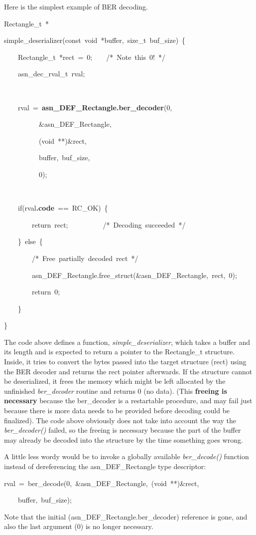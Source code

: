 \documentclass[english,oneside,12pt]{book}
\newenvironment{lyxcode}
{\par\begin{list}{}{
\setlength{\rightmargin}{\leftmargin}
\setlength{\listparindent}{0pt}%
\raggedright
\setlength{\itemsep}{0pt}
\setlength{\parsep}{0pt}
\normalfont\ttfamily}%
 \item[]}
{\end{list}}
\begin{document}
Here is the simplest example of BER decoding.
\begin{lyxcode}
Rectangle\_t~{*}

simple\_deserializer(const~void~{*}buffer,~size\_t~buf\_size)~\{

~~~~Rectangle\_t~{*}rect~=~0;~~~~/{*}~Note~this~0!~{*}/

~~~~asn\_dec\_rval\_t~rval;

~

~~~~rval~=~\textbf{asn\_DEF\_Rectangle.ber\_decoder}(0,

~~~~~~~~~~\&asn\_DEF\_Rectangle,

~~~~~~~~~~(void~{*}{*})\&rect,

~~~~~~~~~~buffer,~buf\_size,

~~~~~~~~~~0);

~

~~~~if(rval\textbf{.code}~==~RC\_OK)~\{

~~~~~~~~return~rect;~~~~~~~~~~/{*}~Decoding~succeeded~{*}/

~~~~\}~else~\{

~~~~~~~~/{*}~Free~partially~decoded~rect~{*}/

~~~~~~~~asn\_DEF\_Rectangle.free\_struct(\&asn\_DEF\_Rectangle,~rect,~0);

~~~~~~~~return~0;

~~~~\}

\}
\end{lyxcode}
The code above defines a function, \emph{simple\_deserializer}, which
takes a buffer and its length and is expected to return a pointer
to the Rectangle\_t structure. Inside, it tries to convert the bytes
passed into the target structure (rect) using the BER decoder and
returns the rect pointer afterwards. If the structure cannot be deserialized,
it frees the memory which might be left allocated by the unfinished
\emph{ber\_decoder} routine and returns 0 (no data). (This \textbf{freeing
is necessary} because the ber\_decoder is a restartable procedure,
and may fail just because there is more data needs to be provided
before decoding could be finalized). The code above obviously does
not take into account the way the \emph{ber\_decoder()} failed, so
the freeing is necessary because the part of the buffer may already
be decoded into the structure by the time something goes wrong.

A little less wordy would be to invoke a globally available \emph{ber\_decode()}
function instead of dereferencing the asn\_DEF\_Rectangle type descriptor:
\begin{lyxcode}
rval~=~ber\_decode(0,~\&asn\_DEF\_Rectangle,~(void~{*}{*})\&rect,

~~~~buffer,~buf\_size);
\end{lyxcode}
Note that the initial (asn\_DEF\_Rectangle.ber\_decoder) reference
is gone, and also the last argument (0) is no longer necessary.
\end{document}
